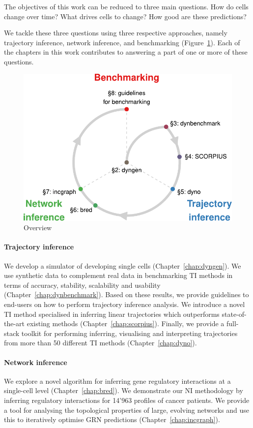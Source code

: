 The objectives of this work can be reduced to three main questions. How do cells change over time? What drives cells to change? How good are these predictions?

We tackle these three questions using three respective approaches, namely trajectory inference, network inference, and benchmarking (Figure~\ref{fig:overview_thesis}). Each of the chapters in this work contributes to answering a part of one or more of these questions.

\begin{figure}[htb!]
	\centering
	\includegraphics[width=.75\linewidth]{fig/overview_cropped.pdf}
	\caption{Overview}
	\label{fig:overview_thesis}
\end{figure}

\paragraph{Trajectory inference} We develop a simulator of developing single cells (Chapter~\ref{chap:dyngen}). We use synthetic data to complement real data in benchmarking TI methods in terms of accuracy, stability, scalability and usability (Chapter~\ref{chap:dynbenchmark}). Based on these results, we provide guidelines to end-users on how to perform trajectory inference analysis. We introduce a novel TI method specialised in inferring linear trajectories which outperforms state-of-the-art existing methods (Chapter~\ref{chap:scorpius}). Finally, we provide a full-stack toolkit for performing inferring, visualising and interpreting trajectories from more than 50 different TI methods (Chapter~\ref{chap:dyno}).

\paragraph{Network inference} We explore a novel algorithm for inferring gene regulatory interactions at a single-cell level (Chapter~\ref{chap:bred}). We demonstrate our NI methodology by inferring regulatory interactions for 14'963 profiles of cancer patients. We provide a tool for analysing the topological properties of large, evolving networks and use this to iteratively optimise GRN predictions (Chapter~\ref{chap:incgraph}).

